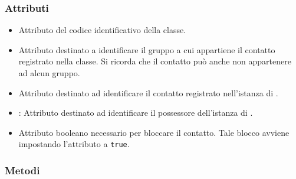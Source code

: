 \subsubsection*{Attributi}

\begin{itemize}
	\item{}
	Attributo del codice identificativo della classe.
	\item{}
	Attributo destinato a identificare il gruppo a cui appartiene il contatto  registrato nella classe. Si ricorda che il contatto può anche non appartenere ad alcun gruppo.
	\item{}
	Attributo destinato ad identificare il contatto registrato nell'istanza di .
	\item{}:
	Attributo destinato ad identificare il possessore dell'istanza di .
	\item{}
	Attributo booleano necessario per bloccare il contatto. Tale blocco avviene impostando l'attributo a \texttt{true}.
\end{itemize}


\subsubsection*{Metodi}

